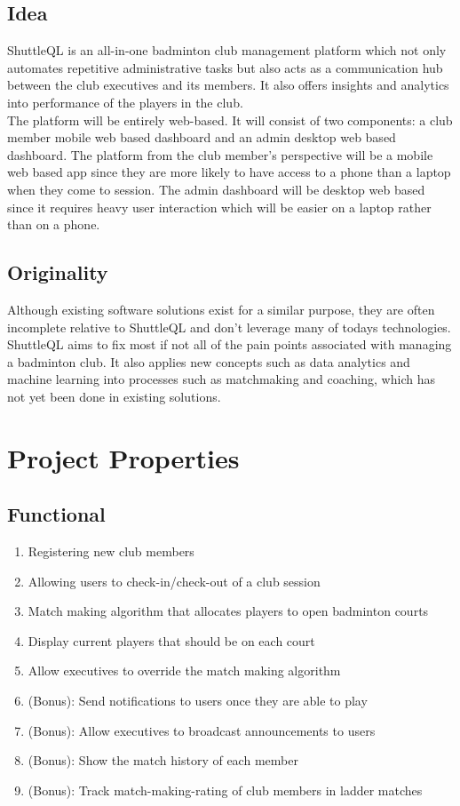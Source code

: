 \documentclass{article}
\begin{document}
\subsection{Idea}
ShuttleQL is an all-in-one badminton club management platform which not only
automates repetitive administrative tasks but also acts as a communication hub
between the club executives and its members. It also offers insights and
analytics into performance of the players in the club. \\

The platform will be entirely web-based. It will consist of two components:
a club member mobile web based dashboard and an admin desktop web based dashboard.
The platform from the club member's perspective will be a mobile web based app
since they are more likely to have access to a phone than a laptop when they
come to session. The admin dashboard will be desktop web based since it requires
heavy user interaction which will be easier on a laptop rather than on a phone.

\subsection{Originality}
Although existing software solutions exist for a similar purpose, they are often
incomplete relative to ShuttleQL and don't leverage many of todays technologies.
ShuttleQL aims to fix most if not all of the pain points associated with
managing a badminton club. It also applies new concepts such as data analytics and
machine learning into processes such as matchmaking and coaching, which has not
yet been done in existing solutions.

\newpage

\section{Project Properties}
\subsection{Functional}
\begin{enumerate}
  \item Registering new club members
  \item Allowing users to check-in/check-out of a club session
  \item Match making algorithm that allocates players to open badminton courts
  \item Display current players that should be on each court
  \item Allow executives to override the match making algorithm
  \item (Bonus): Send notifications to users once they are able to play
  \item (Bonus): Allow executives to broadcast announcements to users
  \item (Bonus): Show the match history of each member
  \item (Bonus): Track match-making-rating of club members in ladder matches
\end{enumerate}
\end{document}
